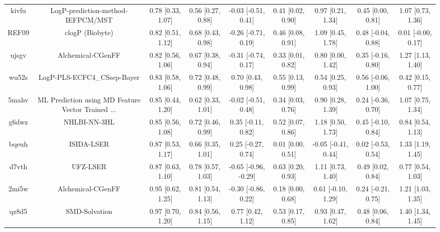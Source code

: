 \documentclass{article}
\begin{document}
\begin{center}
\begin{longtable}{|ccccccccc|}
 kivfu &                  LogP-prediction-method-IEFPCM/MST &  0.78 [0.33, 1.07] &  0.56 [0.27, 0.88] &   -0.03 [-0.51, 0.41] &  0.41 [0.02, 0.90] &    0.97 [0.21, 1.34] &    0.45 [0.00, 0.81] &     1.07 [0.73, 1.36] \\
 REF09 &                                    clogP (Biobyte) &  0.82 [0.51, 1.12] &  0.68 [0.43, 0.98] &   -0.26 [-0.71, 0.19] &  0.46 [0.08, 0.91] &    1.09 [0.45, 1.78] &   0.48 [-0.04, 0.88] &    0.01 [-0.00, 0.17] \\
 ujsgv &                                  Alchemical-CGenFF &  0.82 [0.56, 1.06] &  0.67 [0.38, 0.94] &   -0.31 [-0.74, 0.17] &  0.33 [0.01, 0.82] &    0.80 [0.00, 1.42] &   0.35 [-0.16, 0.80] &     1.27 [1.13, 1.40] \\
 wu52s &                        LogP-PLS-ECFC4\_CSsep-Bayer &  0.83 [0.58, 1.06] &  0.72 [0.48, 0.99] &     0.70 [0.43, 0.98] &  0.55 [0.13, 0.99] &    0.54 [0.25, 0.93] &   0.56 [-0.06, 1.00] &     0.42 [0.15, 0.77] \\
 5mahv &  ML Prediction using MD Feature Vector Trained ... &  0.85 [0.44, 1.20] &  0.62 [0.33, 1.01] &   -0.02 [-0.51, 0.48] &  0.34 [0.03, 0.76] &    0.90 [0.28, 1.39] &   0.24 [-0.36, 0.70] &     1.07 [0.75, 1.34] \\
 g6dwz &                                       NHLBI-NN-3HL &  0.85 [0.56, 1.08] &  0.72 [0.46, 0.99] &    0.35 [-0.11, 0.82] &  0.52 [0.07, 0.86] &    1.18 [0.50, 1.73] &   0.45 [-0.10, 0.84] &     0.84 [0.54, 1.13] \\
 bqeuh &                                         ISIDA-LSER &  0.87 [0.53, 1.17] &  0.66 [0.35, 1.01] &    0.25 [-0.27, 0.74] &  0.01 [0.00, 0.51] &  -0.05 [-0.41, 0.44] &   0.02 [-0.53, 0.54] &     1.33 [1.19, 1.45] \\
 d7vth &                                           UFZ-LSER &  0.87 [0.63, 1.10] &  0.78 [0.57, 1.03] &  -0.65 [-0.96, -0.29] &  0.63 [0.20, 0.93] &    1.11 [0.73, 1.40] &    0.49 [0.02, 0.84] &     0.77 [0.54, 1.03] \\
 2mi5w &                                  Alchemical-CGenFF &  0.95 [0.62, 1.25] &  0.81 [0.54, 1.13] &   -0.30 [-0.86, 0.22] &  0.18 [0.00, 0.68] &   0.61 [-0.10, 1.29] &   0.24 [-0.21, 0.75] &     1.21 [1.03, 1.35] \\
 qz8d5 &                                      SMD-Solvation &  0.97 [0.70, 1.20] &  0.84 [0.56, 1.15] &     0.77 [0.42, 1.12] &  0.53 [0.17, 0.85] &    0.93 [0.47, 1.62] &    0.48 [0.06, 0.84] &     1.40 [1.34, 1.45] \\

\end{longtable}
\end{center}
\end{document}
